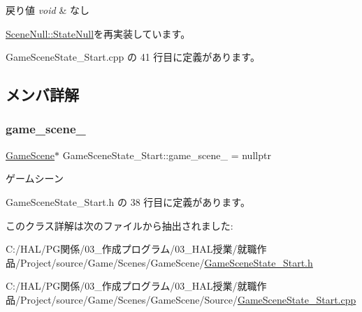 \begin{DoxyRetVals}{戻り値}
{\em void} & なし \\
\hline
\end{DoxyRetVals}


\mbox{\hyperlink{class_scene_null_1_1_state_null_a835f82c22afb290eca79460450088baf}{Scene\+Null\+::\+State\+Null}}を再実装しています。



 Game\+Scene\+State\+\_\+\+Start.\+cpp の 41 行目に定義があります。



\subsection{メンバ詳解}
\mbox{\label{class_game_scene_state___start_af9389c7c8496419a6a4a3d3339acd94f}} 
\subsubsection{\texorpdfstring{game\+\_\+scene\+\_\+}{game\_scene\_}}
{\footnotesize\ttfamily \mbox{\hyperlink{class_game_scene}{Game\+Scene}}$\ast$ Game\+Scene\+State\+\_\+\+Start\+::game\+\_\+scene\+\_\+ = nullptr\hspace{0.3cm}{\ttfamily [private]}}



ゲームシーン 



 Game\+Scene\+State\+\_\+\+Start.\+h の 38 行目に定義があります。



このクラス詳解は次のファイルから抽出されました\+:\begin{DoxyCompactItemize}
\item 
C\+:/\+H\+A\+L/\+P\+G関係/03\+\_\+作成プログラム/03\+\_\+\+H\+A\+L授業/就職作品/\+Project/source/\+Game/\+Scenes/\+Game\+Scene/\mbox{\hyperlink{_game_scene_state___start_8h}{Game\+Scene\+State\+\_\+\+Start.\+h}}\item 
C\+:/\+H\+A\+L/\+P\+G関係/03\+\_\+作成プログラム/03\+\_\+\+H\+A\+L授業/就職作品/\+Project/source/\+Game/\+Scenes/\+Game\+Scene/\+Source/\mbox{\hyperlink{_game_scene_state___start_8cpp}{Game\+Scene\+State\+\_\+\+Start.\+cpp}}\end{DoxyCompactItemize}
